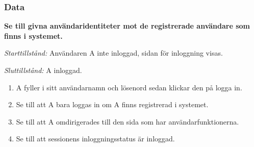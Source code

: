 \documentclass[a4paper]{article}
\begin{document}
\subsubsection{Data}
\begin{FT}
\item
\textbf{Se till givna användaridentiteter mot de registrerade användare som finns i systemet.}

\emph{Starttillstånd:} Användaren A inte inloggad, sidan för inloggning visas.

\emph{Sluttillstånd:} A inloggad.

\begin{enumerate}
\item A fyller i sitt användarnamn och lösenord sedan klickar den på logga in.
\item Se till att A bara loggas in om A finns registrerad i systemet.
\item Se till att A omdirigerades till den sida som har användarfunktionerna.
\item Se till att sessionens inloggningsstatus är inloggad.
\end{enumerate}
\end{FT}
\end{document}
